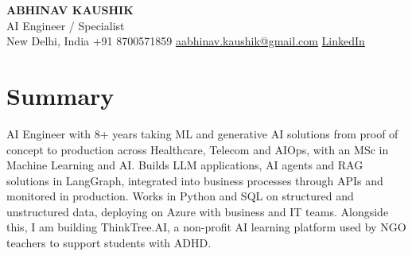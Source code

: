 \documentclass[10pt,a4paper]{article}
\begin{document}
\begin{center}
  {\LARGE\bfseries ABHINAV KAUSHIK}\\[2pt]
  {\large AI Engineer / Specialist}\\[2pt]
  New Delhi, India \textbar{} +91 8700571859 \textbar{} \href{mailto:aabhinav.kaushik@gmail.com}{aabhinav.kaushik@gmail.com} \textbar{} \href{https://www.linkedin.com/in/abhinav-kaushik10/}{LinkedIn}  
\end{center}

\section{Summary}
AI Engineer with 8+ years taking ML and generative AI solutions from proof of concept to production across Healthcare, Telecom and AIOps, with an MSc in Machine Learning and AI. Builds LLM applications, AI agents and RAG solutions in LangGraph, integrated into business processes through APIs and monitored in production. Works in Python and SQL on structured and unstructured data, deploying on Azure with business and IT teams. Alongside this, I am building ThinkTree.AI, a non-profit AI learning platform used by NGO teachers to support students with ADHD.
\end{document}
